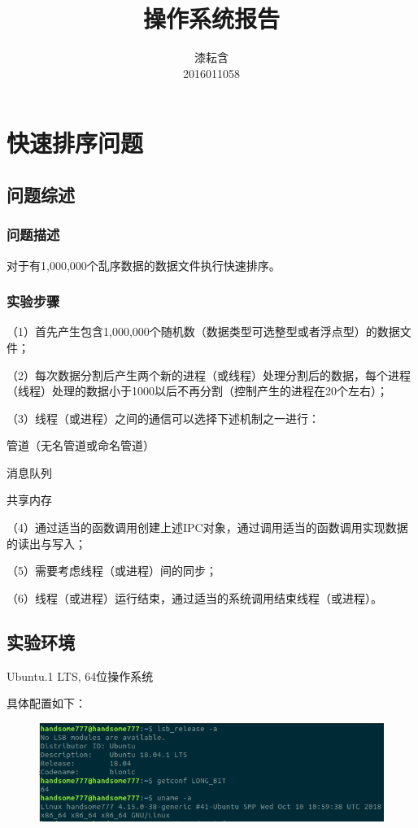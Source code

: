\documentclass[UTF8]{ctexart}
\title{操作系统报告}
\author{漆耘含\\2016011058}
\date{}
\begin{document}
\maketitle
\section{快速排序问题}
\subsection{问题综述}
\subsubsection{问题描述}
对于有1,000,000个乱序数据的数据文件执行快速排序。\par
\subsubsection{实验步骤}
（1）首先产生包含1,000,000个随机数（数据类型可选整型或者浮点型）的数据文件；\par
（2）每次数据分割后产生两个新的进程（或线程）处理分割后的数据，每个进程（线程）处理的数据小于1000以后不再分割（控制产生的进程在20个左右）；\par
（3）线程（或进程）之间的通信可以选择下述机制之一进行：\par
\qquad 管道（无名管道或命名管道）\par
\qquad 消息队列\par
\qquad 共享内存\par
（4）通过适当的函数调用创建上述IPC对象，通过调用适当的函数调用实现数据的读出与写入；\par
（5）需要考虑线程（或进程）间的同步；\par
（6）线程（或进程）运行结束，通过适当的系统调用结束线程（或进程）。\par
\subsection{实验环境}
Ubuntu.1 \quad LTS, 64位操作系统\par
具体配置如下：\par
\begin{figure}[!h]
\centering
\includegraphics[scale = 0.7,bb=0 0 518 148]{ubuntu_info.png}
\label{img1}
\end{figure}
\end{document}
